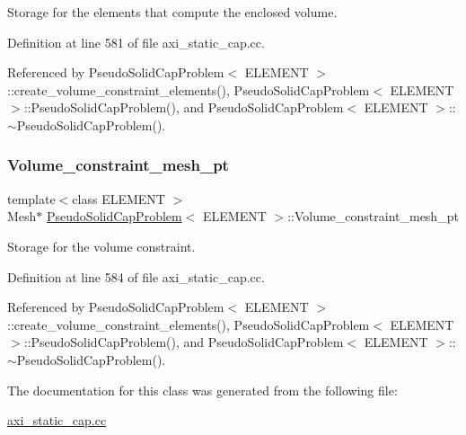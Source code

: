 Storage for the elements that compute the enclosed volume. 



Definition at line 581 of file axi\+\_\+static\+\_\+cap.\+cc.



Referenced by Pseudo\+Solid\+Cap\+Problem$<$ E\+L\+E\+M\+E\+N\+T $>$\+::create\+\_\+volume\+\_\+constraint\+\_\+elements(), Pseudo\+Solid\+Cap\+Problem$<$ E\+L\+E\+M\+E\+N\+T $>$\+::\+Pseudo\+Solid\+Cap\+Problem(), and Pseudo\+Solid\+Cap\+Problem$<$ E\+L\+E\+M\+E\+N\+T $>$\+::$\sim$\+Pseudo\+Solid\+Cap\+Problem().

\mbox{\label{classPseudoSolidCapProblem_a27f4baf9c47cb17e15e6b7a6065fdfe0}} 
\subsubsection{\texorpdfstring{Volume\+\_\+constraint\+\_\+mesh\+\_\+pt}{Volume\_constraint\_mesh\_pt}}
{\footnotesize\ttfamily template$<$class E\+L\+E\+M\+E\+NT $>$ \\
Mesh$\ast$ \hyperlink{classPseudoSolidCapProblem}{Pseudo\+Solid\+Cap\+Problem}$<$ E\+L\+E\+M\+E\+NT $>$\+::Volume\+\_\+constraint\+\_\+mesh\+\_\+pt\hspace{0.3cm}{\ttfamily [private]}}



Storage for the volume constraint. 



Definition at line 584 of file axi\+\_\+static\+\_\+cap.\+cc.



Referenced by Pseudo\+Solid\+Cap\+Problem$<$ E\+L\+E\+M\+E\+N\+T $>$\+::create\+\_\+volume\+\_\+constraint\+\_\+elements(), Pseudo\+Solid\+Cap\+Problem$<$ E\+L\+E\+M\+E\+N\+T $>$\+::\+Pseudo\+Solid\+Cap\+Problem(), and Pseudo\+Solid\+Cap\+Problem$<$ E\+L\+E\+M\+E\+N\+T $>$\+::$\sim$\+Pseudo\+Solid\+Cap\+Problem().



The documentation for this class was generated from the following file\+:\begin{DoxyCompactItemize}
\item 
\hyperlink{axi__static__cap_8cc}{axi\+\_\+static\+\_\+cap.\+cc}\end{DoxyCompactItemize}
